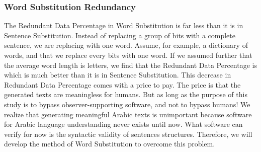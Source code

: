 \documentclass{acm_proc_article-sp}
\begin{document}
\subsubsection{Word Substitution Redundancy}\label{Word-Substitution-Redundancy}
The Redundant Data Percentage in Word Substitution is far less than it is in Sentence Substitution. Instead of replacing a group of bits with a complete sentence, we are replacing with one word. Assume, for example, a dictionary of  words, and that we replace every  bits with one word. If we assumed further that the average word length is  letters, we find that the Redundant Data Percentage is  which is much better than it is in Sentence Substitution. This decrease in Redundant Data Percentage comes with a price to pay. The price is that the generated texts are meaningless for humans. But as long as the purpose of this study is to bypass observer-supporting software, and not to bypass humans! We realize that generating meaningful Arabic texts is unimportant because software for Arabic language understanding never exists until now. What software can verify for now is the syntactic validity of sentences structures. Therefore, we will develop the method of Word Substitution to overcome this problem.
\end{document}
